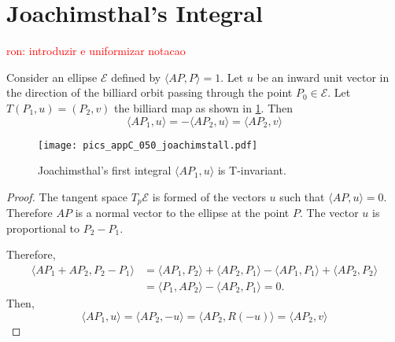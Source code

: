   

\section{Joachimsthal's Integral}

\textcolor{red}{ron: introduzir e uniformizar notacao}


\begin{proposition}\label{prop:invariant_joachim} Consider an ellipse $\mathcal{E}$ defined by $\langle A P,P\rangle=1$. Let $u$ be an inward unit vector in the direction of the billiard orbit passing through the point $P_0\in\mathcal{E} $. Let $T(P_1,u)=(P_2,v)$ the billiard map as shown in   \cref{fig:appC-joachim}.
	Then 
	\[  \langle A P_1,u\rangle =  -\langle A P_2,u\rangle=  \langle A P_2,v\rangle  \]
	
	\end{proposition}

\begin{figure}[H]
	\begin{center}
	 \texttt{[image: pics\_appC\_050\_joachimstall.pdf]}
		\caption {Joachimsthal's first integral  $ \langle AP_1,u\rangle $ is T-invariant.}
		 \label{fig:appC-joachim}
	\end{center}
\end{figure}

\begin{proof} The tangent space  $T_{p}\mathcal{E}$ is formed of the vectors $u$ such that $ \langle A P,u\rangle =0.$ Therefore $AP$ is a normal vector to the ellipse at the point $P$. The vector $u$ is proportional to $P_2-P_1$.
	
	Therefore,
	\begin{align*}  \langle AP_1+AP_2 , P_2-P_1\rangle &= \langle AP_1  , P_2 \rangle + \langle AP_2  , P_1 \rangle  - \langle AP_1  , P_1 \rangle + \langle AP_2  , P_2 \rangle \\
	&= \langle  P_1  , AP_2 \rangle - \langle AP_2  , P_1 \rangle =0. 
	\end{align*}
	Then,
	\[ \langle AP_1 , u\rangle =\langle  AP_2 ,-u\rangle  =  \langle  AP_2 ,R(-u)\rangle  =  \langle  AP_2, v\rangle \]
	\end{proof}
